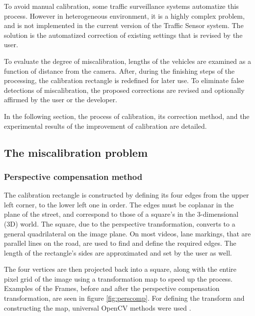 To avoid manual calibration, some traffic surveillance systems automatize this process.
However in heterogeneous environment, it is a highly complex problem, and is not implemented in the current version of the Traffic Sensor system.
The solution is the automatized correction of existing settings that is revised by the user.

To evaluate the degree of miscalibration, lengths of the vehicles are examined as a function of distance from the camera.
After, during the finishing steps of the processing, the calibration rectangle is redefined for later use.
To eliminate false detections of miscalibration, the proposed corrections are revised and optionally affirmed by the user or the developer.

In the following section, the process of calibration, its correction method, and the experimental results of the improvement of calibration are detailed.

\subsection{The miscalibration problem}
\subsubsection{Perspective compensation method}
The calibration rectangle is constructed by defining its four edges from the upper left corner, to the lower left one in order.
The edges must be coplanar in the plane of the street, and correspond to those of a square's in the 3-dimensional (3D) world.
The square, due to the perspective transformation, converts to a general quadrilateral on the image plane.
On most videos, lane markings, that are parallel lines on the road, are used to find and define the required edges.
The length of the rectangle's sides are approximated and set by the user as well.

The four vertices are then projected back into a square, along with the entire pixel grid of the image using a transformation map to speed up the process.
Examples of the Frames, before and after the perspective compensation transformation, are seen in figure \ref{fig:perscomp}.
For defining the transform and constructing the map, universal OpenCV methods were used \cite{PersTrans, WrapPers}.

